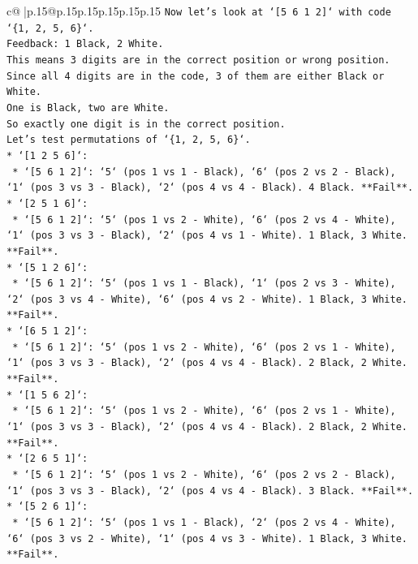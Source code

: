 \documentclass{article}
\begin{document}
{\begin{supertabular}{c@{$\;$}|p{.15\linewidth}@{}p{.15\linewidth}p{.15\linewidth}p{.15\linewidth}p{.15\linewidth}p{.15\linewidth}}
{{{\texttt{Now let's look at `{[}5 6 1 2{]}` with code `\{1, 2, 5, 6\}`.} \\
\texttt{Feedback: 1 Black, 2 White.} \\
\texttt{This means 3 digits are in the correct position or wrong position.} \\
\texttt{Since all 4 digits are in the code, 3 of them are either Black or White.} \\
\texttt{One is Black, two are White.} \\
\texttt{So exactly one digit is in the correct position.} \\
\texttt{Let's test permutations of `\{1, 2, 5, 6\}`.} \\
\texttt{*   `{[}1 2 5 6{]}`:} \\
\texttt{    *   `{[}5 6 1 2{]}`: `5` (pos 1 vs 1 {-} Black), `6` (pos 2 vs 2 {-} Black), `1` (pos 3 vs 3 {-} Black), `2` (pos 4 vs 4 {-} Black). 4 Black. **Fail**.} \\
\texttt{*   `{[}2 5 1 6{]}`:} \\
\texttt{    *   `{[}5 6 1 2{]}`: `5` (pos 1 vs 2 {-} White), `6` (pos 2 vs 4 {-} White), `1` (pos 3 vs 3 {-} Black), `2` (pos 4 vs 1 {-} White). 1 Black, 3 White. **Fail**.} \\
\texttt{*   `{[}5 1 2 6{]}`:} \\
\texttt{    *   `{[}5 6 1 2{]}`: `5` (pos 1 vs 1 {-} Black), `1` (pos 2 vs 3 {-} White), `2` (pos 3 vs 4 {-} White), `6` (pos 4 vs 2 {-} White). 1 Black, 3 White. **Fail**.} \\
\texttt{*   `{[}6 5 1 2{]}`:} \\
\texttt{    *   `{[}5 6 1 2{]}`: `5` (pos 1 vs 2 {-} White), `6` (pos 2 vs 1 {-} White), `1` (pos 3 vs 3 {-} Black), `2` (pos 4 vs 4 {-} Black). 2 Black, 2 White. **Fail**.} \\
\texttt{*   `{[}1 5 6 2{]}`:} \\
\texttt{    *   `{[}5 6 1 2{]}`: `5` (pos 1 vs 2 {-} White), `6` (pos 2 vs 1 {-} White), `1` (pos 3 vs 3 {-} Black), `2` (pos 4 vs 4 {-} Black). 2 Black, 2 White. **Fail**.} \\
\texttt{*   `{[}2 6 5 1{]}`:} \\
\texttt{    *   `{[}5 6 1 2{]}`: `5` (pos 1 vs 2 {-} White), `6` (pos 2 vs 2 {-} Black), `1` (pos 3 vs 3 {-} Black), `2` (pos 4 vs 4 {-} Black). 3 Black. **Fail**.} \\
\texttt{*   `{[}5 2 6 1{]}`:} \\
\texttt{    *   `{[}5 6 1 2{]}`: `5` (pos 1 vs 1 {-} Black), `2` (pos 2 vs 4 {-} White), `6` (pos 3 vs 2 {-} White), `1` (pos 4 vs 3 {-} White). 1 Black, 3 White. **Fail**.} \\
}}}
\end{supertabular}}
\end{document}
